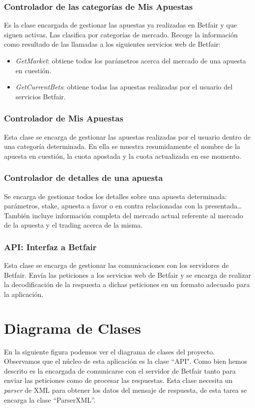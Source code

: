\subsubsection{Controlador de las categorías de Mis Apuestas}
 Es la clase encargada de gestionar las apuestas ya realizadas en Betfair y que siguen activas. Las clasifica por categorías de mercado. Recoge la información como resultado de las llamadas a los siguientes servicios web de Betfair:
  \begin{itemize}
	\item \emph{GetMarket}: obtiene todos los parámetros acerca del mercado de una apuesta en cuestión.
	\item \emph{GetCurrentBets}: obtiene todas las apuestas realizadas por el usuario del servicios Betfair.
\end{itemize}
 
\subsubsection{Controlador de Mis Apuestas}
 Esta clase se encarga de gestionar las apuestas realizadas por el usuario dentro de una categoría determinada. En ella se muestra resumidamente el nombre de la apuesta en cuestión, la cuota apostada y la cuota actualizada en ese momento. 

\subsubsection{Controlador de detalles de una apuesta}
 Se encarga de gestionar todos los detalles sobre una apuesta determinada: parámetros, stake, apuesta a favor o en contra relacionadas con la presentada\ldots También incluye información completa del mercado actual referente al mercado de la apuesta y el trading acerca de la misma.

 
\subsubsection{API: Interfaz a Betfair}
 Esta clase se encarga de gestionar las comunicaciones con los servidores de Betfair. Envía las peticiones a los servicios web de Betfair y se encarga de realizar la decodificación de la respuesta a dichas peticiones en un formato adecuado para la aplicación.

\section{Diagrama de Clases}
 En la siguiente figura podemos ver el diagrama de clases del proyecto. Observamos que el núcleo de esta aplicación es la clase ``API". Como bien hemos descrito es la encargada de comunicarse con el servidor de Betfair tanto para enviar las peticiones como de procesar las respuestas. Esta clase necesita un \emph{parser} de XML para obtener los datos del mensaje de respuesta, de esta tarea se encarga la clase ``ParserXML''.
 
